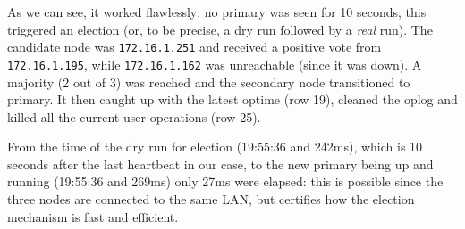 \documentclass[11pt]{article}
\begin{document}
As we can see, it worked flawlessly: no primary was seen for 10 seconds, this triggered an election (or, to be precise, a dry run followed by a \textit{real} run).
The candidate node was \lstinline{172.16.1.251} and received a positive vote from \lstinline{172.16.1.195}, while \lstinline{172.16.1.162} was unreachable (since it was down). A majority (2 out of 3) was reached and the secondary node transitioned to primary. It then caught up with the latest optime (row 19), cleaned the oplog and killed all the current user operations (row 25).

From the time of the dry run for election (19:55:36 and 242ms), which is 10 seconds after the last heartbeat in our case, to the new primary being up and running (19:55:36 and 269ms) only 27ms were elapsed: this is possible since the three nodes are connected to the same LAN, but certifies how the election mechanism is fast and efficient.
\end{document}

